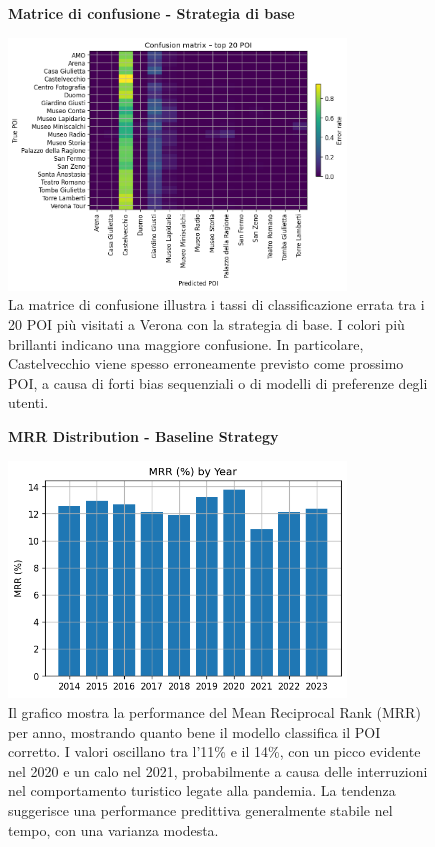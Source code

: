 \begin{itemize}
\begin{enumerate}
\begin{figure}[H]
\centering
\textbf{Matrice di confusione - Strategia di base}\par
\vspace{0.5em}
\includegraphics[width=0.8\textwidth]{../../img/no_SPACE-GEO_n-1_come_current_POI/confusion_matrix.png}
\caption{La matrice di confusione illustra i tassi di classificazione errata tra i 20 POI più visitati a Verona con la strategia di base. I colori più brillanti indicano una maggiore confusione. In particolare, Castelvecchio viene spesso erroneamente previsto come prossimo POI, a causa di forti bias sequenziali o di modelli di preferenze degli utenti.}
\label{fig:baseline_confusion}
\end{figure}

\begin{figure}[H]
\centering
\textbf{MRR Distribution - Baseline Strategy}\par
\vspace{0.5em}
\includegraphics[width=0.8\textwidth]{../../img/no_SPACE-GEO_n-1_come_current_POI/mrr_distribution.png}
\caption{Il grafico mostra la performance del Mean Reciprocal Rank (MRR) per anno, mostrando quanto bene il modello classifica il POI corretto. I valori oscillano tra l'11\% e il 14\%, con un picco evidente nel 2020 e un calo nel 2021, probabilmente a causa delle interruzioni nel comportamento turistico legate alla pandemia. La tendenza suggerisce una performance predittiva generalmente stabile nel tempo, con una varianza modesta.}
\label{fig:baseline_mrr}
\end{figure}


\end{enumerate}
\end{itemize}
